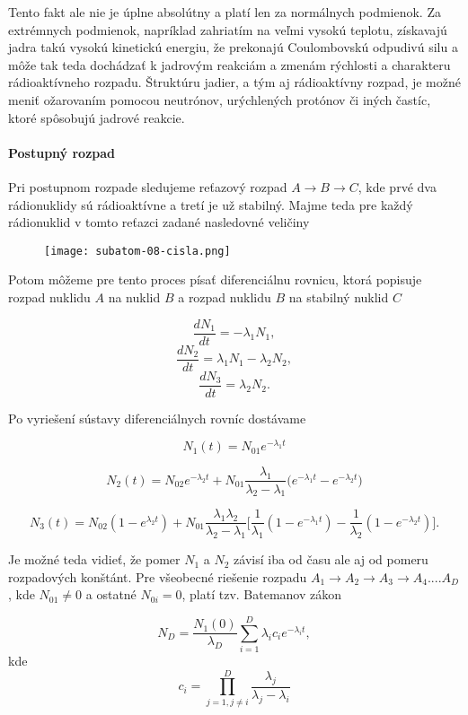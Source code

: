 \documentclass[../../main.tex]{subfiles}
\begin{document}
Tento fakt ale nie je úplne absolútny a platí len za normálnych podmienok. Za extrémnych podmienok, napríklad zahriatím na veľmi vysokú teplotu, získavajú jadra takú vysokú kinetickú energiu, že prekonajú Coulombovskú odpudivú silu a môže tak teda dochádzať k jadrovým reakciám a zmenám rýchlosti a charakteru rádioaktívneho rozpadu. Štruktúru jadier, a tým aj rádioaktívny rozpad, je možné meniť ožarovaním pomocou neutrónov, urýchlených protónov či iných častíc, ktoré spôsobujú jadrové reakcie.

\paragraph{Postupný rozpad}
Pri postupnom rozpade sledujeme reťazový rozpad $A \rightarrow B \rightarrow C$, kde prvé dva rádionuklidy sú rádioaktívne a tretí je už stabilný. Majme teda pre každý rádionuklid v tomto reťazci zadané nasledovné veličiny

\begin{figure}[!h]
\texttt{[image: subatom-08-cisla.png]}
\centering
\end{figure}

Potom môžeme pre tento proces písať diferenciálnu rovnicu, ktorá popisuje rozpad nuklidu $A$ na nuklid $B$ a rozpad nuklidu $B$ na stabilný nuklid $C$

$$ \frac{dN_1}{dt} = -\lambda_1 N_1, $$
$$ \frac{dN_2}{dt} = \lambda_1 N_1 - \lambda_2 N_2, $$
$$ \frac{dN_3}{dt} = \lambda_2 N_2. $$

Po vyriešení sústavy diferenciálnych rovníc dostávame

$$ N_1(t) = N_{01}e^{-\lambda_1 t} $$

$$ N_2(t) = N_{02}e^{-\lambda_2 t} + N_{01}\frac{\lambda_1}{\lambda_2 - \lambda_1} \big( e^{-\lambda_1 t} - e^{-\lambda_2 t}  \big)$$

$$ N_3(t) = N_{02}(1-e^{\lambda_2t}) + N_{01}\frac{\lambda_1 \lambda_2}{\lambda_2 - \lambda_1} \bigg[ \frac{1}{\lambda_1}(1-e^{-\lambda_1t})   -\frac{1}{\lambda_2}(1-e^{-\lambda_2t}) \bigg] .$$

Je možné teda vidieť, že pomer $N_1$ a $N_2$ závisí iba od času ale aj od pomeru rozpadových konštánt. Pre všeobecné riešenie rozpadu $A_1 \rightarrow A_2 \rightarrow A_3 \rightarrow A_4 .... A_D$, kde $N_{01}\neq 0$ a ostatné $N_{0i}=0$, platí tzv. Batemanov zákon 

$$ N_D = \frac{N_1(0)}{\lambda_D} \sum_{i=1}^D \lambda_ic_ie^{-\lambda_it}, $$
kde
$$ c_i = \prod_{j=1, j\neq i}^D \frac{\lambda_j}{\lambda_j - \lambda_i} $$
\end{document}
